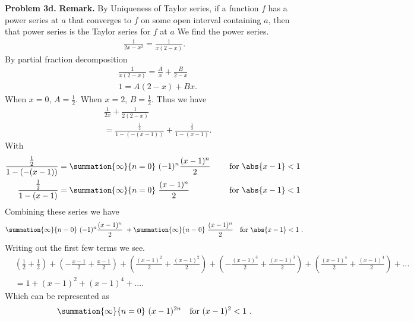 \documentclass{report}
\begin{document}
    \pagebreak \bigbreak \noindent 
    \textbf{Problem 3d.}
    \bigbreak \noindent 
    \textbf{Remark.} By Uniqueness of Taylor series, if a function $f$ has a power series at $a$ that converges to $f$ on some open interval containing $a$, then that power series is the Taylor series for $f$ at $a$
    \bigbreak \noindent 
    We find the power series.
    \begin{align*}
        \frac{1}{2x-x^{2}} = \frac{1}{x(2-x)}
    .\end{align*}
    \bigbreak \noindent 
    By partial fraction decomposition
    \begin{align*}
        &\frac{1}{x(2-x)} = \frac{A}{x} + \frac{B}{2-x} \\
        &1=A(2-x) + Bx
    .\end{align*}
    When $x=0$, $A=\frac{1}{2} $. When $x=2$, $B=\frac{1}{2}$. Thus we have
    \begin{align*}
        &\frac{1}{2x} + \frac{1}{2(2-x)} \\
        &=\frac{\frac{1}{2}}{1-(-(x-1))} + \frac{\frac{1}{2}}{1-(x-1)} 
    .\end{align*}
    \bigbreak \noindent 
    With
    \begin{equation}
    \begin{alignedat}{2}
     \frac{\frac{1}{2}}{1-(-(x-1))} &= \summation{\infty}{n=0}\ (-1)^{n}\frac{(x-1)^{n}}{2}\  \quad \quad &&\text{for $\abs{x-1} < 1$} \\
     \frac{\frac{1}{2}}{1-(x-1)} &=  \summation{\infty}{n=0}\ \frac{(x-1)^{n}}{2} \quad \quad &&\text{for $\abs{x-1} < 1$}\ 
    \end{alignedat}
    \end{equation}
    \bigbreak \noindent 
    Combining these series we have
    \begin{align*}
          \summation{\infty}{n=0}\ (-1)^{n}\frac{(x-1)^{n}}{2}\ + \summation{\infty}{n=0}\ \frac{(x-1)^{n}}{2} \quad \text{for $\abs{x-1} < 1$}\ 
    .\end{align*}
    Writing out the first few terms we see.
    \begin{align*}
        &\left(\frac{1}{2} + \frac{1}{2}\right) + \left(-\frac{x-1}{2} + \frac{x-1}{2}\right) + \left(\frac{(x-1)^{2}}{2} + \frac{(x-1)^{2}}{2}\right) + \left(-\frac{(x-1)^{3}}{2} + \frac{(x-1)^{3}}{2}\right) + \left(\frac{(x-1)^{4}}{2} + \frac{(x-1)^{4}}{2}\right)  + ...\\
        &=1 + (x-1)^{2} + (x-1)^{4} + ...
    .\end{align*}
    Which can be represented as 
    \begin{align*}
        \summation{\infty}{n=0}\ (x-1)^{2n} \quad \text{for $(x-1)^{2} < 1$}\ 
    .\end{align*}
\end{document}

